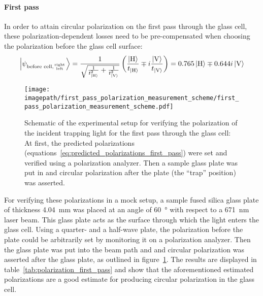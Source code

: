 \paragraph{First pass}
In order to attain circular polarization on the first pass through the glass cell, these polarization-dependent losses need to be pre-compensated when choosing the polarization before the glass cell surface:
\begin{align}
    \label{eq:predicted_polarizations_first_pass}
    \Ket{\psi_{\text{before cell,} {\text{right} \atop \text{left}}}} 
    = \frac{1}{\sqrt{\frac{1}{t_{\Ket{\text{H}}}^2} + \frac{1}{t_{\Ket{\text{V}}}^2}}}
        \left(\frac{\Ket{\text{H}}}{t_{\Ket{\text{H}}}} \mp i \frac{\Ket{\text{V}}}{t_{\Ket{\text{V}}}} \right)
    = 0.765 \Ket{\text{H}} \mp 0.644i \Ket{\text{V}}
\end{align}

\begin{figure}
    \centering
    \texttt{[image: \\imagepath/first\_pass\_polarization\_measurement\_scheme/first\_pass\_polarization\_measurement\_scheme.pdf]}
    \caption{Schematic of the experimental setup for verifying the polarization of the incident trapping light for the first pass through the glass cell: At first, the predicted polarizations (equations~\eqref{eq:predicted_polarizations_first_pass}) were set and verified using a polarization analyzer. Then a sample glass plate was put in and circular polarization after the plate (the ``trap'' position) was asserted.}
    \label{fig:first_pass_polarization_measurement_scheme}
\end{figure}

For verifying these polarizations in a mock setup, a sample fused silica glass plate of thickness \SI{4.04}{\milli\meter} was placed at an angle of \SI{60}{\degree} with respect to a \SI{671}{\nano\meter} laser beam. This glass plate acts as the surface through which the light enters the glass cell. Using a quarter- and a half-wave plate, the polarization before the plate could be arbitrarily set by monitoring it on a polarization analyzer. Then the glass plate was put into the beam path and and circular polarization was asserted after the glass plate, as outlined in figure~\ref{fig:first_pass_polarization_measurement_scheme}. The results are displayed in table~\ref{tab:polarization_first_pass} and show that the aforementioned estimated polarizations  are a good estimate for producing circular polarization in the glass cell.

